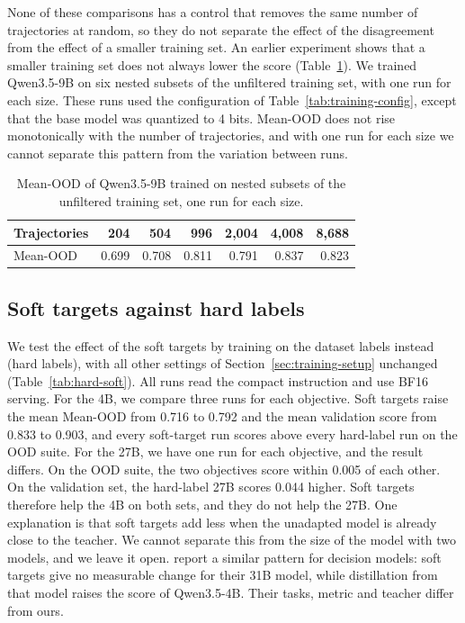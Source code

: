 None of these comparisons has a control that removes the same number of trajectories at random, so they do not separate the effect of the disagreement from the effect of a smaller training set.
An earlier experiment shows that a smaller training set does not always lower the score (Table~\ref{tab:data-size}).
We trained Qwen3.5-9B on six nested subsets of the unfiltered training set, with one run for each size.
These runs used the configuration of Table~\ref{tab:training-config}, except that the base model was quantized to 4 bits.
Mean-OOD does not rise monotonically with the number of trajectories, and with one run for each size we cannot separate this pattern from the variation between runs.

\begin{table}[h]
\caption{Mean-OOD of Qwen3.5-9B trained on nested subsets of the unfiltered training set, one run for each size.}
\label{tab:data-size}
\centering
\small
\begin{tabular}{@{}lrrrrrr@{}}
\toprule
Trajectories & 204 & 504 & 996 & 2,004 & 4,008 & 8,688 \\
\midrule
Mean-OOD & 0.699 & 0.708 & 0.811 & 0.791 & 0.837 & 0.823 \\
\bottomrule
\end{tabular}
\end{table}

\subsection{Soft targets against hard labels}
\label{app:ablation-targets}

We test the effect of the soft targets by training on the dataset labels instead (hard labels), with all other settings of Section~\ref{sec:training-setup} unchanged (Table~\ref{tab:hard-soft}).
All runs read the compact instruction and use BF16 serving.
For the 4B, we compare three runs for each objective.
Soft targets raise the mean Mean-OOD from 0.716 to 0.792 and the mean validation score from 0.833 to 0.903, and every soft-target run scores above every hard-label run on the OOD suite.
For the 27B, we have one run for each objective, and the result differs.
On the OOD suite, the two objectives score within 0.005 of each other.
On the validation set, the hard-label 27B scores 0.044 higher.
Soft targets therefore help the 4B on both sets, and they do not help the 27B.
One explanation is that soft targets add less when the unadapted model is already close to the teacher.
We cannot separate this from the size of the model with two models, and we leave it open.
\citet{geuter2026releasing} report a similar pattern for decision models: soft targets give no measurable change for their 31B model, while distillation from that model raises the score of Qwen3.5-4B.
Their tasks, metric and teacher differ from ours.

